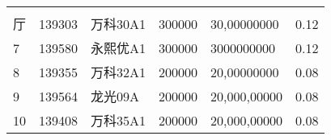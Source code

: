 \begin{table}[]
\begin{tabular}{llllll}
                    &                         &                         &                           &                               &                         \\
\multirow{2}{*}{厅}  & \multirow{2}{*}{139303} & \multirow{2}{*}{万科30A1} & \multirow{2}{*}{300000}   & \multirow{2}{*}{30,00000000}  & \multirow{2}{*}{0.12}   \\
                    &                         &                         &                           &                               &                         \\
\multirow{3}{*}{7}  & \multirow{3}{*}{139580} & \multirow{3}{*}{永熙优A1}  & \multirow{3}{*}{300000}   & \multirow{3}{*}{3000000000}   & \multirow{3}{*}{0.12}   \\
                    &                         &                         &                           &                               &                         \\
                    &                         &                         &                           &                               &                         \\
\multirow{2}{*}{8}  & \multirow{2}{*}{139355} & \multirow{2}{*}{万科32A1} & \multirow{2}{*}{200000}   & \multirow{2}{*}{20,00000000}  & \multirow{2}{*}{0.08}   \\
                    &                         &                         &                           &                               &                         \\
\multirow{2}{*}{9}  & \multirow{2}{*}{139564} & \multirow{2}{*}{龙光09A}  & \multirow{2}{*}{200000}   & \multirow{2}{*}{20,000,00000} & \multirow{2}{*}{0.08}   \\
                    &                         &                         &                           &                               &                         \\
\multirow{2}{*}{10} & \multirow{2}{*}{139408} & \multirow{2}{*}{万科35A1} & \multirow{2}{*}{200000}   & \multirow{2}{*}{20,000,00000} & \multirow{2}{*}{0.08}   \\
                    &                         &                         &                           &                               &
\end{tabular}
\end{table}